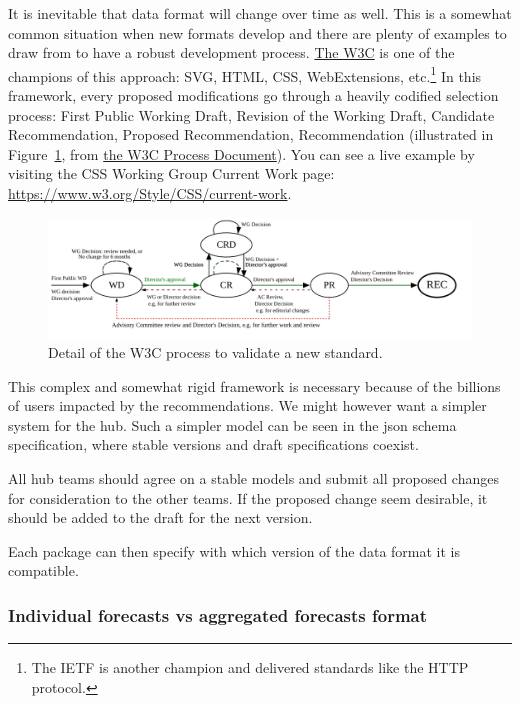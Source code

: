 \documentclass[
  letterpaper,
  DIV=11,
  numbers=noendperiod]{scrartcl}
\begin{document}
It is inevitable that data format will change over time as well. This is
a somewhat common situation when new formats develop and there are
plenty of examples to draw from to have a robust development process.
\href{https://www.w3.org/}{The W3C} is one of the champions of this
approach: SVG, HTML, CSS, WebExtensions, etc.\footnote{The IETF is
  another champion and delivered standards like the HTTP protocol.} In
this framework, every proposed modifications go through a heavily
codified selection process: First Public Working Draft, Revision of the
Working Draft, Candidate Recommendation, Proposed Recommendation,
Recommendation (illustrated in Figure~\ref{fig-w3c-process}, from
\href{https://www.w3.org/2021/Process-20211102/}{the W3C Process
Document}). You can see a live example by visiting the CSS Working Group
Current Work page: \url{https://www.w3.org/Style/CSS/current-work}.

\begin{figure}

{\centering \includegraphics{w3c_process.svg}

}

\caption{\label{fig-w3c-process}Detail of the W3C process to validate a
new standard.}

\end{figure}

This complex and somewhat rigid framework is necessary because of the
billions of users impacted by the recommendations. We might however want
a simpler system for the hub. Such a simpler model can be seen in the
json schema specification, where stable versions and draft
specifications coexist.

All hub teams should agree on a stable models and submit all proposed
changes for consideration to the other teams. If the proposed change
seem desirable, it should be added to the draft for the next version.

Each package can then specify with which version of the data format it
is compatible.

\hypertarget{individual-forecasts-vs-aggregated-forecasts-format}{%
\subsubsection{Individual forecasts vs aggregated forecasts
format}\label{individual-forecasts-vs-aggregated-forecasts-format}}
\end{document}
